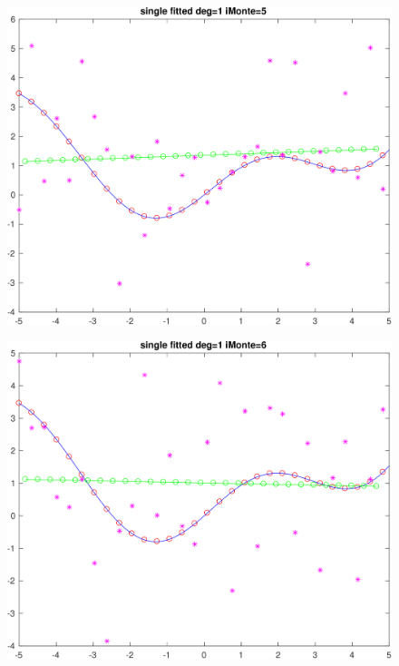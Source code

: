 \documentclass[11pt]{article}
\begin{document}
\begin{figure}[h!]
\centering\includegraphics[scale=0.1]{single_poly_d_1_iMonte_5.png}
\end{figure}


\begin{figure}[h!]
\centering\includegraphics[scale=0.1]{single_poly_d_1_iMonte_6.png}
\end{figure}
\end{document}
